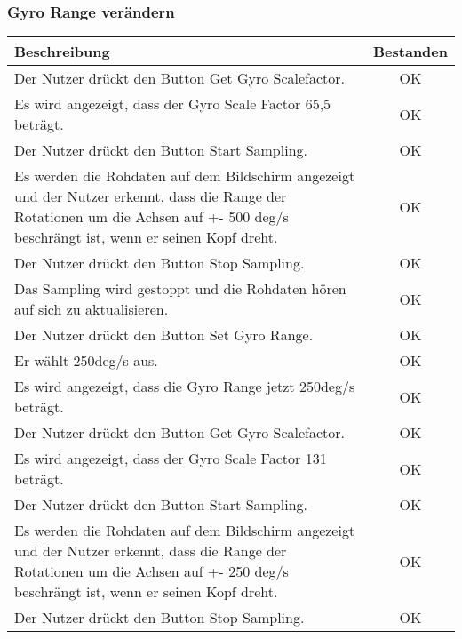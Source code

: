 \documentclass[a4paper,12pt]{article}
\begin{document}
\subsubsection{Gyro Range verändern}
\begin{tabular}{ | p{12cm} | c| }
	\hline
	\textbf{Beschreibung} & \textbf{Bestanden}\\
	\hline
	Der Nutzer drückt den Button \glqq{}Get Gyro Scalefactor\grqq{}. & OK\\
	\hline
	Es wird angezeigt, dass der Gyro Scale Factor 65,5 beträgt. & OK\\
	\hline
	Der Nutzer drückt den Button \glqq{}Start Sampling\grqq{}. & OK\\
	\hline
	Es werden die Rohdaten auf dem Bildschirm angezeigt und der Nutzer erkennt, dass die Range der Rotationen um die Achsen auf +- 500 deg/s beschrängt ist, wenn er seinen Kopf dreht. & OK\\
	\hline
	Der Nutzer drückt den Button \glqq{}Stop Sampling\grqq{}. & OK \\
	\hline
	Das Sampling wird gestoppt und die Rohdaten hören auf sich zu aktualisieren. & OK \\
	\hline
	Der Nutzer drückt den Button \glqq{}Set Gyro Range\grqq{}. & OK\\
	\hline
	Er wählt 250deg/s aus. & OK\\
	\hline
	Es wird angezeigt, dass die Gyro Range jetzt 250deg/s beträgt. & OK\\
	\hline
	Der Nutzer drückt den Button \glqq{}Get Gyro Scalefactor\grqq{}. & OK\\
	\hline
	Es wird angezeigt, dass der Gyro Scale Factor 131 beträgt. & OK\\
	\hline
	Der Nutzer drückt den Button \glqq{}Start Sampling\grqq{}. & OK\\
	\hline
	Es werden die Rohdaten auf dem Bildschirm angezeigt und der Nutzer erkennt, dass die Range der Rotationen um die Achsen auf +- 250 deg/s beschrängt ist, wenn er seinen Kopf dreht. & OK\\
	\hline
	Der Nutzer drückt den Button \glqq{}Stop Sampling\grqq{}. & OK \\
	\hline
\end{tabular}
\end{document}

